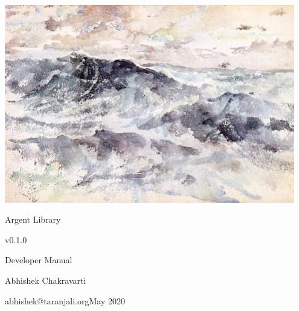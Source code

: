 \documentclass[twoside,12pt,english]{book}
\begin{document}
%
%
\begin{titlepage}
\centering
\includegraphics[width=0.95\textwidth]{the-great-sea.jpg}\par\vspace{1em}
\Huge Argent Library\par\vspace{0.5em}\large v0.1.0\par\vspace{0.5em} 
\LARGE Developer Manual\par\vspace{5em} Abhishek Chakravarti\par
\vspace{0.5em}\small abhishek@taranjali.org\vfill\large May 2020
\end{titlepage}


%
%

\end{document}
